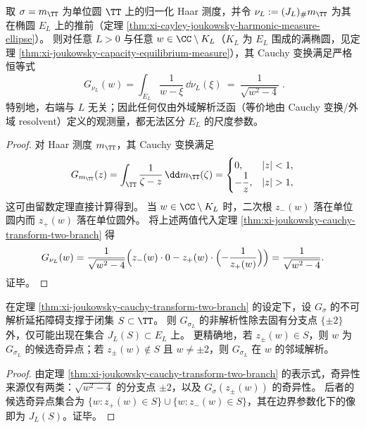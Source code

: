 \begin{corollary}\label{cor:xi-joukowsky-haar-cauchy-rigidity}
取 \(\sigma=m_{\TT}\) 为单位圆 \(\TT\) 上的归一化 Haar 测度，并令 \(\nu_L:=(J_L)_\# m_{\TT}\) 为其在椭圆 \(E_L\) 上的推前（定理 \ref{thm:xi-cayley-joukowsky-harmonic-measure-ellipse}）。
则对任意 \(L>0\) 与任意 \(w\in\CC\setminus K_L\)（\(K_L\) 为 \(E_L\) 围成的满椭圆，见定理 \ref{thm:xi-joukowsky-capacity-equilibrium-measure}），其 Cauchy 变换满足严格恒等式
\[
\boxed{\;
G_{\nu_L}(w)=\int_{E_L}\frac{1}{w-\xi}\,\dd\nu_L(\xi)\ =\ \frac{1}{\sqrt{w^2-4}}\; }.
\]
特别地，右端与 \(L\) 无关；因此任何仅由外域解析泛函（等价地由 Cauchy 变换/外域 resolvent）定义的观测量，都无法区分 \(E_L\) 的尺度参数。
\end{corollary}
\begin{proof}
对 Haar 测度 \(m_{\TT}\)，其 Cauchy 变换满足
\[
G_{m_{\TT}}(z)=\int_{\TT}\frac{1}{\zeta-z}\,\dd m_{\TT}(\zeta)=
\begin{cases}
0,& |z|<1,\\
-\dfrac{1}{z},& |z|>1,
\end{cases}
\]
这可由留数定理直接计算得到。
当 \(w\in\CC\setminus K_L\) 时，二次根 \(z_-(w)\) 落在单位圆内而 \(z_+(w)\) 落在单位圆外。
将上述两值代入定理 \ref{thm:xi-joukowsky-cauchy-transform-two-branch} 得
\[
G_{\nu_L}(w)=\frac{1}{\sqrt{w^2-4}}
\Bigl(z_-(w)\cdot 0-z_+(w)\cdot\Bigl(-\frac{1}{z_+(w)}\Bigr)\Bigr)
=\frac{1}{\sqrt{w^2-4}}.
\]
证毕。
\end{proof}

\begin{corollary}\label{cor:xi-joukowsky-singularity-transport}
在定理 \ref{thm:xi-joukowsky-cauchy-transform-two-branch} 的设定下，设 \(G_\sigma\) 的不可解析延拓障碍支撑于闭集 \(S\subset\TT\)。
则 \(G_{\sigma_L}\) 的非解析性除去固有分支点 \(\{\pm2\}\) 外，仅可能出现在集合 \(J_L(S)\subset E_L\) 上。
更精确地，若 \(z_\pm(w)\in S\)，则 \(w\) 为 \(G_{\sigma_L}\) 的候选奇异点；若 \(z_\pm(w)\notin S\) 且 \(w\neq\pm2\)，则 \(G_{\sigma_L}\) 在 \(w\) 的邻域解析。
\end{corollary}

\begin{proof}
由定理 \ref{thm:xi-joukowsky-cauchy-transform-two-branch} 的表示式，奇异性来源仅有两类：\(\sqrt{w^2-4}\) 的分支点 \(\pm2\)，以及 \(G_\sigma(z_\pm(w))\) 的奇异性。
后者的候选奇异点集合为 \(\{w:z_+(w)\in S\}\cup\{w:z_-(w)\in S\}\)，其在边界参数化下的像即为 \(J_L(S)\)。证毕。
\end{proof}

